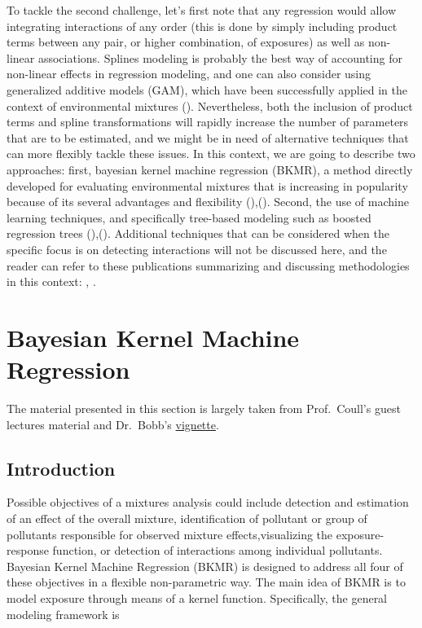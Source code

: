 \documentclass[
]{book}
\begin{document}
To tackle the second challenge, let's first note that any regression would allow integrating interactions of any order (this is done by simply including product terms between any pair, or higher combination, of exposures) as well as non-linear associations. Splines modeling is probably the best way of accounting for non-linear effects in regression modeling, and one can also consider using generalized additive models (GAM), which have been successfully applied in the context of environmental mixtures (\citet{zheng2020evaluating}). Nevertheless, both the inclusion of product terms and spline transformations will rapidly increase the number of parameters that are to be estimated, and we might be in need of alternative techniques that can more flexibly tackle these issues. In this context, we are going to describe two approaches: first, bayesian kernel machine regression (BKMR), a method directly developed for evaluating environmental mixtures that is increasing in popularity because of its several advantages and flexibility (\citet{bobb2015bayesian}),(\citet{bobb2018statistical}). Second, the use of machine learning techniques, and specifically tree-based modeling such as boosted regression trees (\citet{lampa2014identification}),(\citet{bellavia2021joint}). Additional techniques that can be considered when the specific focus is on detecting interactions will not be discussed here, and the reader can refer to these publications summarizing and discussing methodologies in this context: \citet{barrera2017systematic}, \citet{sun2013statistical}.

\hypertarget{bayesian-kernel-machine-regression}{%
\section{Bayesian Kernel Machine Regression}\label{bayesian-kernel-machine-regression}}

The material presented in this section is largely taken from Prof.~Coull's guest lectures material and Dr.~Bobb's \href{https://jenfb.github.io/bkmr/overview.html}{vignette}.

\hypertarget{introduction-1}{%
\subsection{Introduction}\label{introduction-1}}

Possible objectives of a mixtures analysis could include detection and estimation of an effect of the overall mixture,
identification of pollutant or group of pollutants responsible for
observed mixture effects,visualizing the exposure-response function, or
detection of interactions among individual pollutants. Bayesian Kernel Machine Regression (BKMR) is designed to address all
four of these objectives in a flexible non-parametric way. The main idea of BKMR is to model exposure through means of a kernel function. Specifically, the general modeling framework is
\end{document}
